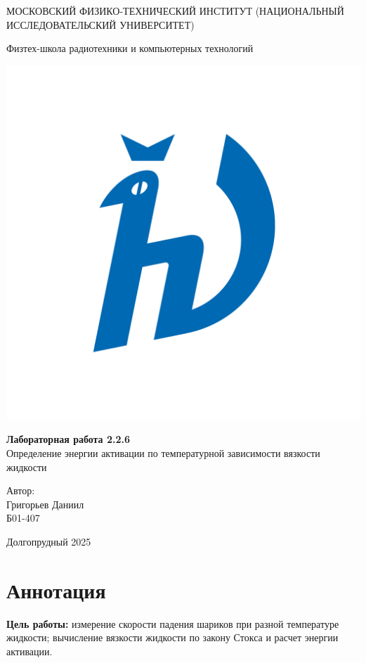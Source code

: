 \documentclass[a4paper, 12pt]{article}
\begin{document}

\begin{titlepage}
\begin{center}
    {\large МОСКОВСКИЙ ФИЗИКО-ТЕХНИЧЕСКИЙ ИНСТИТУТ (НАЦИОНАЛЬНЫЙ ИССЛЕДОВАТЕЛЬСКИЙ УНИВЕРСИТЕТ)}
\end{center}

\begin{center}
    {\large Физтех-школа радиотехники и компьютерных технологий}
\end{center}

\vspace{3.5cm}

\begin{center}
    \includegraphics[width=0.4\linewidth]{img/hv_full.png}
\end{center}

\vspace{0.05cm}

{\huge
\begin{center}
    {\bf Лабораторная работа 2.2.6}\\
    Определение энергии активации по температурной зависимости вязкости жидкости
\end{center}
}

\vspace{0.5cm}

\begin{flushright}
{\LARGE Автор:\\ Григорьев Даниил \\
\vspace{0.1cm}
Б01-407}
\end{flushright}

\vspace{0.5cm}
\begin{center}
    Долгопрудный 2025
\end{center}
\end{titlepage}
    \newpage

\section{Аннотация}
    \textbf{Цель работы:} измерение скорости падения шариков при разной температуре жидкости; вычисление вязкости жидкости по закону Стокса и расчет энергии активации.
\end{document}
